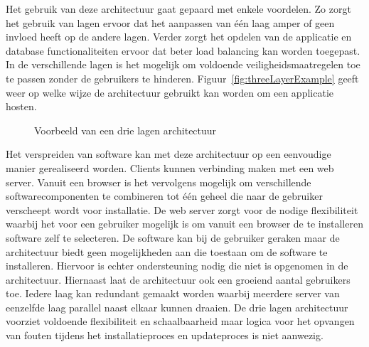 Het gebruik van deze architectuur gaat gepaard met enkele voordelen.
Zo zorgt het gebruik van lagen ervoor dat het aanpassen van één laag amper of geen invloed heeft op de andere lagen.
Verder zorgt het opdelen van de applicatie en database functionaliteiten ervoor dat beter load balancing kan worden toegepast.
In de verschillende lagen is het mogelijk om voldoende veiligheidsmaatregelen toe te passen zonder de gebruikers te hinderen.
Figuur~\vref{fig:threeLayerExample} geeft weer op welke wijze de architectuur gebruikt kan worden om een applicatie hosten.

\begin{figure}[!ht]
\centering
{}
\caption{Voorbeeld van een drie lagen architectuur \citep{hanson2000client}}
\label{fig:threeLayerExample}
\end{figure}

Het verspreiden van software kan met deze architectuur op een eenvoudige manier gerealiseerd worden.
Clients kunnen verbinding maken met een web server.
Vanuit een browser is het vervolgens mogelijk om verschillende softwarecomponenten te combineren tot één geheel die naar de gebruiker verscheept wordt voor installatie.
De web server zorgt voor de nodige flexibiliteit waarbij het voor een gebruiker mogelijk is om vanuit een browser de te installeren software zelf te selecteren.
De software kan bij de gebruiker geraken maar de architectuur biedt geen mogelijkheden aan die toestaan om de software te installeren.
Hiervoor is echter ondersteuning nodig die niet is opgenomen in de architectuur.
Hiernaast laat de architectuur ook een groeiend aantal gebruikers toe.
Iedere laag kan redundant gemaakt worden waarbij meerdere server van eenzelfde laag parallel naast elkaar kunnen draaien.
De drie lagen architectuur voorziet voldoende flexibiliteit en schaalbaarheid maar logica voor het opvangen van fouten tijdens het installatieproces en updateproces is niet aanwezig.

